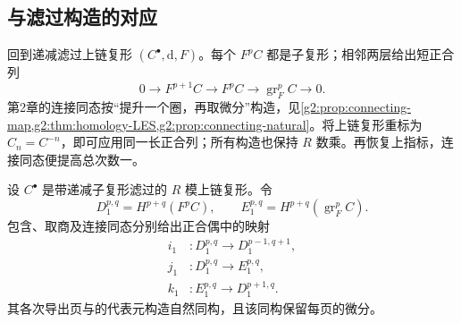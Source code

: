 \subsection{与滤过构造的对应}
\label{g2:subsec:1003:02}

回到递减滤过上链复形 \((C^\bullet,\mathrm d,F)\)。每个 \(F^pC\) 都是子复形；相邻两层给出短正合列
\[
	0\longrightarrow F^{p+1}C\longrightarrow F^pC\longrightarrow\operatorname{gr}_F^pC\longrightarrow0.
\]
第2章的连接同态按“提升一个圈，再取微分”构造，见\cref{g2:prop:connecting-map,g2:thm:homology-LES,g2:prop:connecting-natural}。将上链复形重标为 \(C_n=C^{-n}\)，即可应用同一长正合列；所有构造也保持 \(R\) 数乘。再恢复上指标，连接同态便提高总次数一。

\begin{proposition}\label{g2:prop:filtered-exact-couple}
	设 \(C^\bullet\) 是带递减子复形滤过的 \(R\) 模上链复形。令
	\[
		D_1^{p,q}=H^{p+q}(F^pC),\qquad
		E_1^{p,q}=H^{p+q}(\operatorname{gr}_F^pC).
	\]
	包含、取商及连接同态分别给出正合偶中的映射
	\[
	\begin{aligned}
		i_1&:D_1^{p,q}\longrightarrow D_1^{p-1,q+1},\\
		j_1&:D_1^{p,q}\longrightarrow E_1^{p,q},\\
		k_1&:E_1^{p,q}\longrightarrow D_1^{p+1,q}.
	\end{aligned}
	\]
	其各次导出页与的代表元构造自然同构，且该同构保留每页的微分。
\end{proposition}
